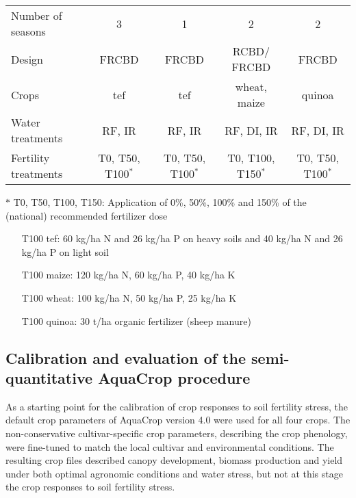 \begin{landscape}
\begin{table}[htbp]
{\begin{threeparttable}
\begin{tabular}{lrrrc}
Number of seasons & \multicolumn{1}{c}{3} & \multicolumn{1}{c}{1} & \multicolumn{1}{c}{2} & 2 \\
Design & \multicolumn{1}{c}{FRCBD} & \multicolumn{1}{c}{FRCBD} & \multicolumn{1}{c}{RCBD/ FRCBD} & FRCBD \\
Crops & \multicolumn{1}{c}{tef} & \multicolumn{1}{c}{tef} & \multicolumn{1}{c}{wheat, maize} & quinoa \\
Water treatments & \multicolumn{1}{c}{RF, IR} & \multicolumn{1}{c}{RF, IR} & \multicolumn{1}{c}{RF, DI, IR} & RF, DI, IR \\
Fertility treatments & \multicolumn{1}{c}{T0, T50, T100$^{*}$} & \multicolumn{1}{c}{T0, T50, T100$^{*}$} & \multicolumn{1}{c}{T0, T100, T150$^{*}$} & T0, T50, T100$^{*}$ \\
\bottomrule				
    	\end{tabular}%
    	\begin{tablenotes}
        \small{
      	\item[$\ast$] T0, T50, T100, T150: Application of 0\%, 50\%, 100\% and 150\% of the (national) recommended fertilizer dose 
		\begin{itemize}
        \item[] T100 tef: 60 \si{kg/ha} N and 26 \si{kg/ha} P on heavy soils and 40 \si{kg/ha} N and 26 \si{kg/ha} P on light soil  \parencite{earo2002}
		\item[] T100 maize: 120 \si{kg/ha} N, 60 \si{kg/ha} P, 40 \si{kg/ha} K \parencite{moac2010} 
		\item[] T100 wheat: 100 \si{kg/ha} N, 50 \si{kg/ha} P, 25 \si{kg/ha} K \parencite{moac2010} 
		\item[] T100 quinoa: 30 \si{t/ha} organic fertilizer (sheep manure) \parencite{miranda2012a}
		\end{itemize} 
		} 
    	\end{tablenotes}
        \end{threeparttable}
              }
  \label{tab:ch3_metExp}%
\end{table}%
\end{landscape}

\subsection{Calibration and evaluation of the semi-quantitative AquaCrop procedure}
As a starting point for the calibration of crop responses to soil fertility stress, the default crop parameters of AquaCrop version 4.0 \parencite{raes2012} were used for all four crops. The non-conservative cultivar-specific crop parameters, describing the crop phenology, were fine-tuned to match the local cultivar and environmental conditions. The resulting crop files described canopy development, biomass production and yield under both optimal agronomic conditions and water stress, but not at this stage the crop responses to soil fertility stress.

